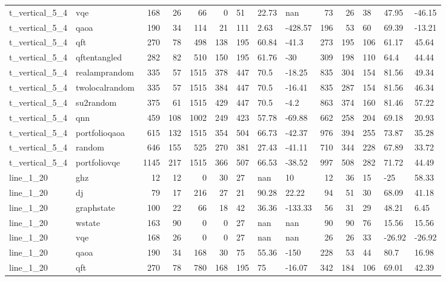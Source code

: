 \begin{longtable}{llrrrrlllrrlll}
t\_vertical\_5\_4 & vqe & 168 & 26 & 66 & 0 & 51 & 22.73 & nan & 73 & 26 & 38 & 47.95 & -46.15 \\
t\_vertical\_5\_4 & qaoa & 190 & 34 & 114 & 21 & 111 & 2.63 & -428.57 & 196 & 53 & 60 & 69.39 & -13.21 \\
t\_vertical\_5\_4 & qft & 270 & 78 & 498 & 138 & 195 & 60.84 & -41.3 & 273 & 195 & 106 & 61.17 & 45.64 \\
t\_vertical\_5\_4 & qftentangled & 282 & 82 & 510 & 150 & 195 & 61.76 & -30 & 309 & 198 & 110 & 64.4 & 44.44 \\
t\_vertical\_5\_4 & realamprandom & 335 & 57 & 1515 & 378 & 447 & 70.5 & -18.25 & 835 & 304 & 154 & 81.56 & 49.34 \\
t\_vertical\_5\_4 & twolocalrandom & 335 & 57 & 1515 & 384 & 447 & 70.5 & -16.41 & 835 & 287 & 154 & 81.56 & 46.34 \\
t\_vertical\_5\_4 & su2random & 375 & 61 & 1515 & 429 & 447 & 70.5 & -4.2 & 863 & 374 & 160 & 81.46 & 57.22 \\
t\_vertical\_5\_4 & qnn & 459 & 108 & 1002 & 249 & 423 & 57.78 & -69.88 & 662 & 258 & 204 & 69.18 & 20.93 \\
t\_vertical\_5\_4 & portfolioqaoa & 615 & 132 & 1515 & 354 & 504 & 66.73 & -42.37 & 976 & 394 & 255 & 73.87 & 35.28 \\
t\_vertical\_5\_4 & random & 646 & 155 & 525 & 270 & 381 & 27.43 & -41.11 & 710 & 344 & 228 & 67.89 & 33.72 \\
t\_vertical\_5\_4 & portfoliovqe & 1145 & 217 & 1515 & 366 & 507 & 66.53 & -38.52 & 997 & 508 & 282 & 71.72 & 44.49 \\
line\_1\_20 & ghz & 12 & 12 & 0 & 30 & 27 & nan & 10 & 12 & 36 & 15 & -25 & 58.33 \\
line\_1\_20 & dj & 79 & 17 & 216 & 27 & 21 & 90.28 & 22.22 & 94 & 51 & 30 & 68.09 & 41.18 \\
line\_1\_20 & graphstate & 100 & 22 & 66 & 18 & 42 & 36.36 & -133.33 & 56 & 31 & 29 & 48.21 & 6.45 \\
line\_1\_20 & wstate & 163 & 90 & 0 & 0 & 27 & nan & nan & 90 & 90 & 76 & 15.56 & 15.56 \\
line\_1\_20 & vqe & 168 & 26 & 0 & 0 & 27 & nan & nan & 26 & 26 & 33 & -26.92 & -26.92 \\
line\_1\_20 & qaoa & 190 & 34 & 168 & 30 & 75 & 55.36 & -150 & 228 & 53 & 44 & 80.7 & 16.98 \\
line\_1\_20 & qft & 270 & 78 & 780 & 168 & 195 & 75 & -16.07 & 342 & 184 & 106 & 69.01 & 42.39 \\

\end{longtable}
